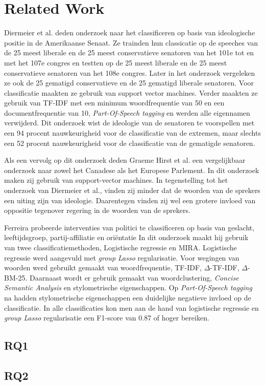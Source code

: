 \section{Related Work}
\label{sec:rel}

Diermeier et al. deden onderzoek naar het classificeren op basis van ideologische positie in de Amerikaanse Senaat\cite{diermeier_godbout_yu_kaufmann_2012}. Ze trainden hun classicatie op de speeches van de 25 meest liberale en de 25 meest conservatieve senatoren van het 101e tot en met het 107e congres en testten op de 25 meest liberale en de 25 meest conservatieve senatoren van het 108e congres. Later in het onderzoek vergeleken ze ook de 25 gematigd conservatieve  en de 25 gematigd liberale senatoren. Voor classificatie maakten ze gebruik van support vector machines. Verder maakten ze gebruik van TF-IDF met een minimum woordfrequentie van 50 en een documentfrequentie van 10, \textit{Part-Of-Speech tagging} en werden alle eigennamen verwijderd. Dit onderzoek wist de ideologie van de senatoren te voorspellen met een 94 procent nauwkeurigheid voor de classificatie van de extremen, maar slechts een 52 procent nauwkeurigheid voor de classificatie van de gematigde senatoren.\par
Als een vervolg op dit onderzoek deden Graeme Hirst et al. een vergelijkbaar onderzoek naar zowel het Canadese als het Europese Parlement\cite{Hirst_textto}. In dit onderzoek maken zij gebruik van support-vector machines. In tegenstelling tot het onderzoek van Diermeier et al., vinden zij minder dat de woorden van de sprekers een uiting zijn van ideologie. Daarentegen vinden zij wel een grotere invloed van oppositie tegenover regering in de woorden van de sprekers.\par
Ferreira probeerde interventies van politici te classificeren op basis van geslacht, leeftijdsgroep, partij-affiliatie en ori\"{e}ntatie\cite{Ferreira2016UsingTT} In dit onderzoek maakt hij gebruik van twee classificatiemethoden, Logistische regressie en MIRA. Logistische regressie werd aangevuld met \textit{group Lasso} regularisatie. Voor wegingen van woorden werd gebruikt gemaakt van woordfrequentie, TF-IDF, $\Delta$-TF-IDF, $\Delta$-BM-25. Daarnaast wordt er gebruik gemaakt van woordclustering, \textit{Concise Semantic Analysis} en stylometrische eigenschappen. Op \textit{Part-Of-Speech tagging} na hadden stylometrische eigenschappen een duidelijke negatieve invloed op de classificatie. In alle classificaties kon men aan de hand van logistische regressie en \textit{group Lasso} regularisatie een F1-score van 0.87 of hoger bereiken.\par


\subsection{RQ1}

\subsection{RQ2}

